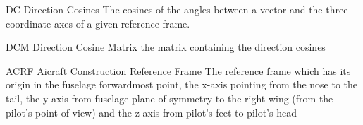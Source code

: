   {DC}            %
  {Direction Cosines}  %
  {The cosines of the angles between a vector and the three coordinate axes of a given reference frame.} %

   {DCM}%
   {Direction Cosine Matrix}  %
   {the matrix containing the direction cosines}%

  {ACRF}            %
  {Aicraft Construction Reference Frame}  %
  {The reference frame which has its origin in the fuselage forwardmost point, the x-axis pointing from the nose to the tail, the y-axis from fuselage plane of symmetry to the right wing (from the pilot's point of view) and the z-axis from pilot's feet to pilot's head} %
%

